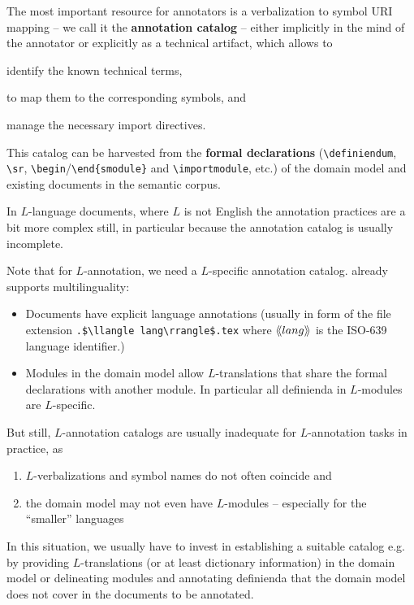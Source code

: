 \documentclass[runningheads]{llncs}
\def\llangle{\langle\kern-.2em\langle}
\def\rrangle{\rangle\kern-.2em\rangle}
\begin{document}
The most important resource for annotators is a verbalization to symbol URI mapping -- we
call it the \textbf{annotation catalog} -- either implicitly in the mind of the annotator
or explicitly as a technical artifact, which allows to
\begin{inparaenum}[\em i\rm)]
\item identify the known technical terms,
\item to map them to the corresponding symbols, and 
\item manage the necessary import directives.
\end{inparaenum}
This catalog can be harvested from the \textbf{formal declarations}
(\lstinline|\definiendum|, \lstinline|\sr|, \lstinline[language={}]|\begin|/\lstinline[language={}]|\end{smodule}| and
\lstinline|\importmodule|, etc.) of the domain model and existing documents in the
semantic corpus.

In $L$-language documents, where $L$ is not English the annotation practices are a bit
more complex still, in particular because the annotation catalog is usually incomplete.

Note that for $L$-annotation, we need a $L$-specific annotation catalog. 
\sTeX already supports multilinguality:
\begin{itemize}
\item Documents have explicit language annotations (usually in form of the file extension
  \lstinline[mathescape]|.$\llangle lang\rrangle$.tex| where $\llangle lang\rrangle$ is the
  ISO-639 language identifier.)
\item Modules in the domain model allow $L$-translations that share the formal
  declarations with another module. In particular all definienda in $L$-modules are
  $L$-specific.
\end{itemize}

But still, $L$-annotation catalogs are usually inadequate for $L$-annotation tasks in
practice, as
\begin{enumerate}[\em i\rm)]
\item $L$-verbalizations and symbol names do not often coincide and
\item the domain model may not even have $L$-modules -- especially for the ``smaller''
  languages
\end{enumerate}
 In this situation, we usually have to invest in
establishing a suitable catalog e.g. by providing $L$-translations (or at least dictionary
information) in the domain model or delineating modules and annotating definienda that the
domain model does not cover in the documents to be annotated.
\end{document}
